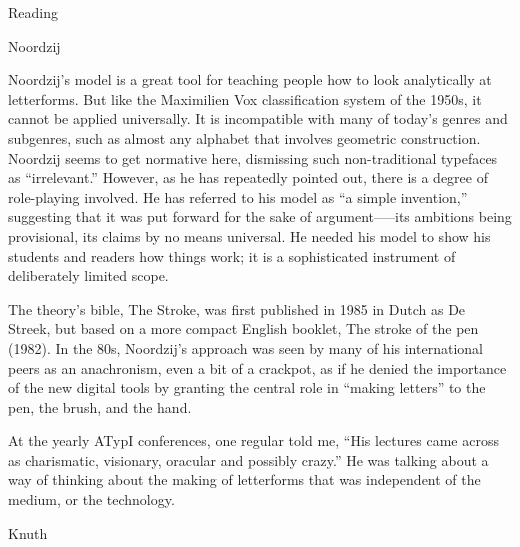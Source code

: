 \documentclass[11pt]{PalisadesLakesBook}
\begin{document}
\begin{plSection}{Reading}
\begin{plSection}{Noordzij}
\begin{plQuote}{}{}
Noordzij's model is a great tool for teaching people 
how to look analytically at letterforms. 
But like the Maximilien Vox classification system of the 1950s, 
it cannot be applied universally. 
It is incompatible with many of today's genres and subgenres, 
such as almost any alphabet that involves geometric construction. 
Noordzij seems to get normative here, 
dismissing such non-traditional typefaces as “irrelevant.” 
However, as he has repeatedly pointed out, 
there is a degree of role-playing involved. 
He has referred to his model as “a simple invention,” 
suggesting that it was put forward for the sake of argument—--its
ambitions being provisional, its claims by no means universal. 
He needed his model to show his students and readers 
how things work; 
it is a sophisticated instrument of deliberately limited scope.
 
The theory's bible, The Stroke, was first published 
in 1985 in Dutch as De Streek, 
but based on a more compact English booklet, 
The stroke of the pen (1982). 
In the 80s, Noordzij's approach was seen 
by many of his international peers as an anachronism, 
even a bit of a crackpot, 
as if he denied the importance of the new digital tools 
by granting the central role in ``making letters''
to the pen, the brush, and the hand.

At the yearly ATypI conferences, one regular told me, 
``His lectures came across 
as charismatic, visionary, oracular and possibly crazy.'' 
He was talking about a way of thinking about 
the making of letterforms 
that was independent of the medium, or the technology.
\end{plQuote}%



\end{plSection}%
\begin{plSection}{Knuth}









\end{plSection}
\end{plSection}
\end{document}
